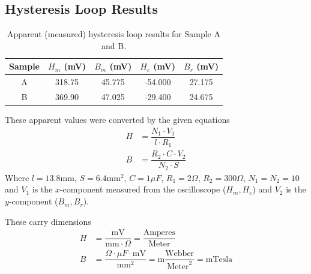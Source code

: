 \documentclass{article}
\begin{document}
\subsection{Hysteresis Loop Results}
\begin{table}[H]
	\begin{center}



		\begin{tabular}{ccccc}
			\toprule
			Sample & $H_m$ (mV) & $B_m$ (mV) & $H_c$ (mV) & $B_r$ (mV) \\
			\midrule
			A      & 318.75     & 45.775     & -54.000    & 27.175     \\
			B      & 369.90     & 47.025     & -29.400    & 24.675     \\
			\bottomrule
		\end{tabular}

	\end{center}
	\caption{Apparent (measured) hysteresis loop results for Sample A and B.}
\end{table}

These apparent values were converted by the given equations
\begin{align}
	H & = \dfrac{N_1 \cdot V_1}{l \cdot R_1}         \\
	B & = \dfrac{R_2 \cdot C \cdot V_2}{N_2 \cdot S}
\end{align}
Where $l=13.8$mm, $S=6.4\text{mm}^2$, $C=1\mu F$, $R_1=2\Omega$, $R_2=300\Omega$, $N_1=N_2=10$ and $V_1$ is the $x$-component
measured from the oscilloscope ($H_m, H_c$) and $V_2$ is the $y$-component ($B_m, B_r$).

These carry dimensions
\begin{align*}
	H & = \dfrac{\text{mV}}{\text{mm} \cdot \Omega} = \dfrac{\text{Amperes}}{\text{Meter}}                                      \\
	B & = \dfrac{\Omega \cdot \mu F \cdot \text{mV}}{\text{mm}^2} = \text{m}\dfrac{\text{Webber}}{\text{Meter}^2}=\text{mTesla}
\end{align*}
\end{document}
